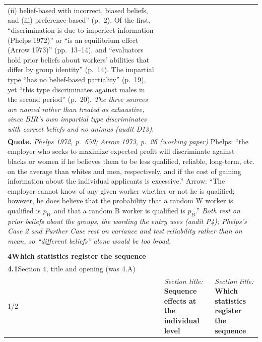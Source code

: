 \documentclass[10pt]{article}
\theoremstyle{definition}
\newlength{\fullw}\setlength{\fullw}{25.9cm}
\newcommand{\entryhead}[2]{\multicolumn{3}{|l|}{\rule{0pt}{2.6ex}\large\textbf{#1}\quad #2} \\ \hline}
\begin{document}
{\begin{longtable}{|p{0.9cm}|p{12.2cm}|p{12.2cm}|}
{(ii) belief-based with incorrect, biased beliefs, and (iii) preference-based'' (p.~2).
Of the first, ``discrimination is due to imperfect information (Phelps 1972)'' or ``is an
equilibrium effect (Arrow 1973)'' (pp.~13--14), and ``evaluators hold prior beliefs about
workers' abilities that differ by group identity'' (p.~14). The impartial type ``has no
belief-based partiality'' (p.~19), yet ``this type discriminates against males in the
second period'' (p.~20). \newline \textit{The three sources are named rather than treated as exhaustive, since BIR's own
impartial type discriminates with correct beliefs and no animus (audit D13).}} \\
\multicolumn{3}{|p{\fullw}|}{\textbf{Quote.} \textit{Phelps 1972, p.~659; Arrow 1973, p.~26 (working paper)} \newline Phelps: ``the employer who seeks to maximize expected profit will discriminate
against blacks or women if he believes them to be less qualified, reliable, long-term,
etc. on the average than whites and men, respectively, and if the cost of gaining
information about the individual applicants is excessive.'' Arrow: ``The employer cannot
know of any given worker whether or not he is qualified; however, he does believe that the
probability that a random W worker is qualified is $p_W$ and that a random B worker is
qualified is $p_B$.'' \newline \textit{Both rest on prior beliefs about the groups, the wording the entry uses (audit P4);
Phelps's Case 2 and Further Case rest on variance and test reliability rather than on
mean, so ``different beliefs'' alone would be too broad.}} \\ \hline
\multicolumn{3}{|l|}{} \\ \hline
\multicolumn{3}{|l|}{\rule{0pt}{3.2ex}\Large\textbf{4\quad Which statistics register the sequence}} \\ \hline\hline
\entryhead{4.1}{Section 4, title and opening (was 4.A)\quad{\footnotesize\textit{(formerly E.8)}}}
1/2 & \textit{Section title:} \textbf{Sequence effects at the individual level} & \textit{Section title:} \textbf{Which statistics register the sequence} \\ \hline

\end{longtable}}
\end{document}
